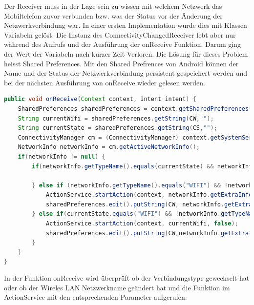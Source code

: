  Der Receiver muss in der Lage sein zu wissen mit welchem Netzwerk das Mobiltelefon zuvor verbunden bzw. was der Status vor der Änderung der Netzwerkverbindung war. In einer ersten Implementation wurde dies mit Klassen Variabeln gelöst. Die Instanz des ConnectivityChangedReceiver lebt  aber nur während des Aufrufs und der Ausführung der onReceive Funktion. Darum ging der Wert der Variabeln nach kurzer Zeit Verloren. Die Lösung für dieses Problem heisst Shared Preferences. Mit den Shared Prefrences von Android können der Name und der Status der Netzwerkverbindung persistent gespeichert werden und bei der nächsten Ausführung von onReceive wieder gelesen werden. \\
\begin{lstlisting}[language=Java]
public void onReceive(Context context, Intent intent) {
    SharedPreferences sharedPreferences = context.getSharedPreferences("com.koki.app.wifiaction",Context.MODE_PRIVATE);
    String currentWifi = sharedPreferences.getString(CW,"");
    String currentState = sharedPreferences.getString(CS,"");
    ConnectivityManager cm = (ConnectivityManager) context.getSystemService(Context.CONNECTIVITY_SERVICE);
    NetworkInfo networkInfo = cm.getActiveNetworkInfo();
    if(networkInfo != null) {
        if(networkInfo.getTypeName().equals(currentState) && networkInfo.getExtraInfo().equals(currentWifi) ) {

        } else if (networkInfo.getTypeName().equals("WIFI") && !networkInfo.getExtraInfo().equals(currentWifi)) {
            ActionService.startAction(context, networkInfo.getExtraInfo(), true);
            sharedPreferences.edit().putString(CW, networkInfo.getExtraInfo()).putString(CS,networkInfo.getTypeName()).commit();
        } else if(currentState.equals("WIFI") && !networkInfo.getTypeName().equals("WIFI")) {
            ActionService.startAction(context, currentWifi, false);
            sharedPreferences.edit().putString(CW,networkInfo.getExtraInfo()).putString(CS,networkInfo.getTypeName()).commit();
        }
    }
}
\end{lstlisting}
In der Funktion onReceive wird überprüft ob der Verbindungstype gewechselt hat oder ob der Wireles LAN Netzwerkname geändert hat und die Funktion im ActionService mit den entsprechenden Parameter aufgerufen.

